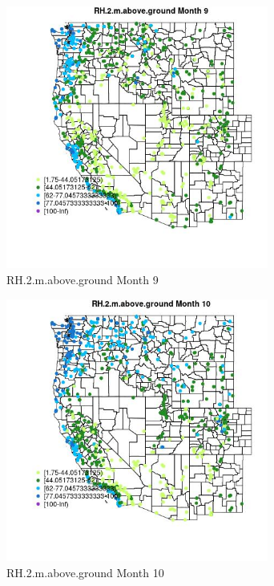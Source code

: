 \begin{figure} 
\centering  
\includegraphics[width=0.77\textwidth]{Code_Outputs/Report_ML_input_PM25_Step4_part_e_de_duplicated_aves_compiled_2019-05-21wNAs_MapObsMo9RH2maboveground.jpg} 
\caption{\label{fig:Report_ML_input_PM25_Step4_part_e_de_duplicated_aves_compiled_2019-05-21wNAsMapObsMo9RH2maboveground}RH.2.m.above.ground Month 9} 
\end{figure} 
 

\begin{figure} 
\centering  
\includegraphics[width=0.77\textwidth]{Code_Outputs/Report_ML_input_PM25_Step4_part_e_de_duplicated_aves_compiled_2019-05-21wNAs_MapObsMo10RH2maboveground.jpg} 
\caption{\label{fig:Report_ML_input_PM25_Step4_part_e_de_duplicated_aves_compiled_2019-05-21wNAsMapObsMo10RH2maboveground}RH.2.m.above.ground Month 10} 
\end{figure} 
 

